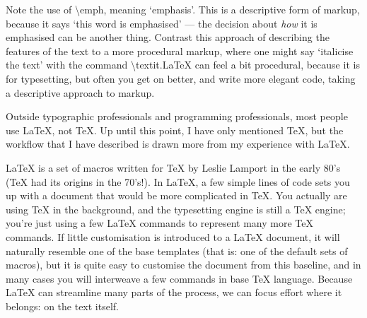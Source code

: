 \documentclass[11pt, oneside]{memoir}
\begin{document}
Note the use of \gc \textbackslash emph\nf , meaning `emphasis'. This is a descriptive form of markup, because it says `this word is emphasised' — the decision about \emph{how} it is emphasised can be another thing. Contrast this approach of describing the features of the text to a more procedural markup, where one might say `italicise the text' with the command \gc \textbackslash textit.\nf LaTeX can feel a bit procedural, because it is for typesetting, but often you get on better, and write more elegant code, taking a descriptive approach to markup.

Outside typographic professionals and programming professionals, most people use \LaTeX{}, not \TeX{}. Up until this point, I have only mentioned TeX, but the workflow that I have described is drawn more from my experience with LaTeX.

LaTeX is a set of macros written for TeX by Leslie Lamport in the early 80's (TeX had its origins in the 70's!). In LaTeX, a few simple lines of code sets you up with a document that would be more complicated in TeX. You actually are using TeX in the background, and the typesetting engine is still a TeX engine; you're just using a few LaTeX commands to represent many more TeX commands. If little customisation is introduced to a LaTeX document, it will naturally resemble one of the base templates (that is: one of the default sets of macros), but it is quite easy to customise the document from this baseline, and in many cases you will interweave a few commands in base TeX language. Because LaTeX can streamline many parts of the process, we can focus effort where it belongs: on the text itself.
\end{document}
